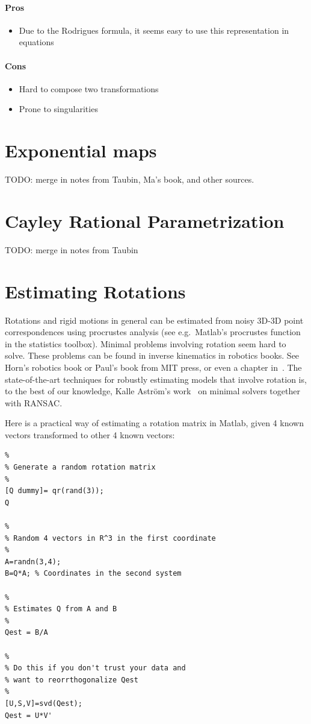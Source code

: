 \paragraph{Pros}
\begin{itemize}
\item Due to the Rodrigues formula, it seems easy to use this representation in
equations
\end{itemize}

\paragraph{Cons}
\begin{itemize}
\item Hard to compose two transformations
\item Prone to singularities
\end{itemize}

\section{Exponential maps}

TODO: merge in notes from Taubin, Ma's book, and other sources.

\section{Cayley Rational Parametrization}
TODO: merge in notes from Taubin

\section{Estimating Rotations}
Rotations and rigid motions in general can be estimated from noisy 3D-3D point
correspondences using procrustes analysis (see e.g.\ Matlab's procrustes
function in the statistics toolbox). Minimal problems involving rotation seem hard to
solve. These problems can be found in inverse kinematics in robotics books. See
Horn's robotics book or Paul's book from MIT press, or even a chapter
in~\cite{Cox:etal:Ideals}. The state-of-the-art techniques for robustly estimating models
that involve rotation is, to the best of our knowledge, Kalle Astr\"om's
work~\cite{Astrom:etal:Polysolver:IJCV09} on minimal solvers together with
RANSAC.  

Here is a practical way of estimating a rotation matrix in Matlab, given 4
known vectors transformed to other 4 known vectors:
\begin{verbatim}
%
% Generate a random rotation matrix
%
[Q dummy]= qr(rand(3));
Q

%
% Random 4 vectors in R^3 in the first coordinate
%
A=randn(3,4);
B=Q*A; % Coordinates in the second system

%
% Estimates Q from A and B
%
Qest = B/A

%
% Do this if you don't trust your data and
% want to reorrthogonalize Qest
%
[U,S,V]=svd(Qest);
Qest = U*V'
\end{verbatim}

